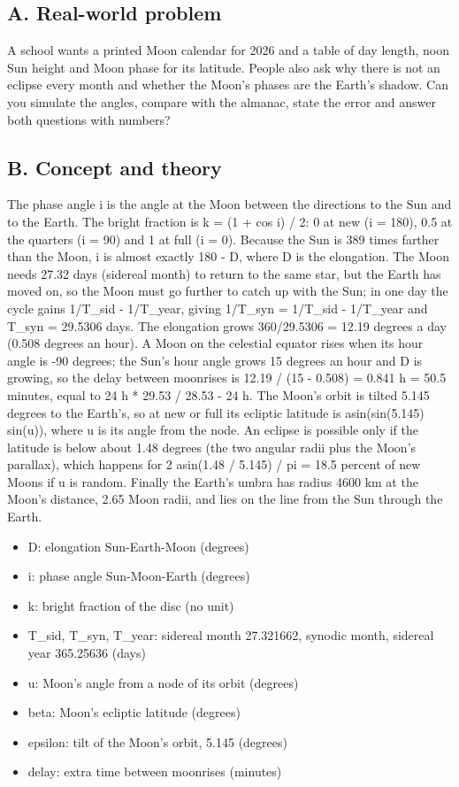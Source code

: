 \documentclass[11pt,a4paper]{article}
\begin{document}
\subsection*{A. Real-world problem}
A school wants a printed Moon calendar for 2026 and a table of day length, noon Sun height and Moon phase for its latitude. People also ask why there is not an eclipse every month and whether the Moon's phases are the Earth's shadow. Can you simulate the angles, compare with the almanac, state the error and answer both questions with numbers?

\subsection*{B. Concept and theory}
The phase angle i is the angle at the Moon between the directions to the Sun and to the Earth. The bright fraction is k = (1 + cos i) / 2: 0 at new (i = 180), 0.5 at the quarters (i = 90) and 1 at full (i = 0). Because the Sun is 389 times farther than the Moon, i is almost exactly 180 - D, where D is the elongation. The Moon needs 27.32 days (sidereal month) to return to the same star, but the Earth has moved on, so the Moon must go further to catch up with the Sun; in one day the cycle gains 1/T\_sid - 1/T\_year, giving 1/T\_syn = 1/T\_sid - 1/T\_year and T\_syn = 29.5306 days. The elongation grows 360/29.5306 = 12.19 degrees a day (0.508 degrees an hour). A Moon on the celestial equator rises when its hour angle is -90 degrees; the Sun's hour angle grows 15 degrees an hour and D is growing, so the delay between moonrises is 12.19 / (15 - 0.508) = 0.841 h = 50.5 minutes, equal to 24 h * 29.53 / 28.53 - 24 h. The Moon's orbit is tilted 5.145 degrees to the Earth's, so at new or full its ecliptic latitude is asin(sin(5.145) sin(u)), where u is its angle from the node. An eclipse is possible only if the latitude is below about 1.48 degrees (the two angular radii plus the Moon's parallax), which happens for 2 asin(1.48 / 5.145) / pi = 18.5 percent of new Moons if u is random. Finally the Earth's umbra has radius 4600 km at the Moon's distance, 2.65 Moon radii, and lies on the line from the Sun through the Earth.

\begin{itemize}[nosep]
\item D: elongation Sun-Earth-Moon (degrees)
\item i: phase angle Sun-Moon-Earth (degrees)
\item k: bright fraction of the disc (no unit)
\item T\_sid, T\_syn, T\_year: sidereal month 27.321662, synodic month, sidereal year 365.25636 (days)
\item u: Moon's angle from a node of its orbit (degrees)
\item beta: Moon's ecliptic latitude (degrees)
\item epsilon: tilt of the Moon's orbit, 5.145 (degrees)
\item delay: extra time between moonrises (minutes)
\end{itemize}
\end{document}
